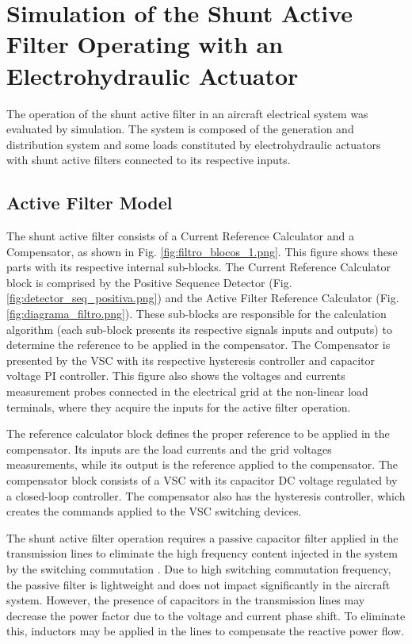 \section{Simulation of the Shunt Active Filter Operating with an Electrohydraulic Actuator}

The operation of the shunt active filter in an aircraft electrical system was evaluated by simulation. The system is composed of the generation and distribution system and some loads constituted by electrohydraulic actuators with shunt active filters connected to its respective inputs.

\subsection{Active Filter Model}

The shunt active filter consists of a Current Reference Calculator and a Compensator, as shown in Fig. \ref{fig:filtro_blocos_1.png}. This figure shows these parts with its respective internal sub-blocks. The Current Reference Calculator block is comprised by the Positive Sequence Detector (Fig. \ref{fig:detector_seq_positiva.png}) and the Active Filter Reference Calculator (Fig. \ref{fig:diagrama_filtro.png}). These sub-blocks are responsible for the calculation algorithm (each sub-block presents its respective signals inputs and outputs) to determine the reference to be applied in the compensator. The Compensator is presented by the VSC with its respective hysteresis controller and capacitor voltage PI controller. This figure also shows the voltages and currents measurement probes connected in the electrical grid at the non-linear load terminals, where they acquire the inputs for the active filter operation.

The reference calculator block defines the proper reference to be applied in the compensator. Its inputs are the load currents and the grid voltages measurements, while its output is the reference applied to the compensator. The compensator block consists of a VSC with its capacitor DC voltage regulated by a closed-loop controller. The compensator also has the hysteresis controller, which creates the commands applied to the VSC switching devices.

The shunt active filter operation requires a passive capacitor filter applied in the transmission lines to eliminate the high frequency content injected in the system by the switching commutation \citep{Akagi2007}. Due to high switching commutation frequency, the passive filter is lightweight and does not impact significantly in the aircraft system. However, the presence of capacitors in the transmission lines may decrease the power factor due to the voltage and current phase shift. To eliminate this, inductors may be applied in the lines to compensate the reactive power flow.

